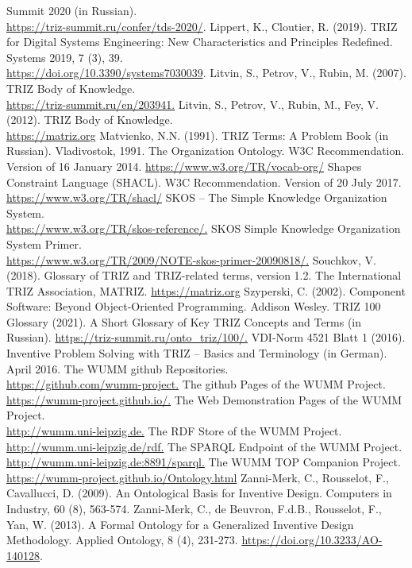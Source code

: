 \documentclass[12pt,a4paper]{article}
\begin{document}
\begin{thebibliography}{xxx}
  Summit 2020 (in Russian).\\ \url{https://triz-summit.ru/confer/tds-2020/}. 
 Lippert, K., Cloutier, R. (2019). TRIZ for Digital Systems
  Engineering: New Characteristics and Principles Redefined. Systems 2019,
  7 (3), 39.\\  \url{https://doi.org/10.3390/systems7030039}.
 Litvin, S., Petrov, V., Rubin, M. (2007). TRIZ Body of
  Knowledge.\\ \url{https://triz-summit.ru/en/203941.}
 Litvin, S., Petrov, V., Rubin, M., Fey, V. (2012). TRIZ Body of
  Knowledge.\\  \url{https://matriz.org}
 Matvienko, N.N. (1991). TRIZ Terms: A Problem Book (in Russian).
  Vladivostok, 1991.
 The Organization Ontology. W3C Recommendation. Version of 16
  January 2014.  \url{https://www.w3.org/TR/vocab-org/}
 Shapes Constraint Language (SHACL). W3C Recommendation. Version
  of 20 July 2017. \url{https://www.w3.org/TR/shacl/}
 SKOS – The Simple Knowledge Organization System.\\
  \url{https://www.w3.org/TR/skos-reference/.}
 SKOS Simple Knowledge Organization System Primer.\\
  \url{https://www.w3.org/TR/2009/NOTE-skos-primer-20090818/.}
 Souchkov, V. (2018). Glossary of TRIZ and TRIZ-related terms,
  version 1.2. The International TRIZ Association, MATRIZ.
  \url{https://matriz.org}
 Szyperski, C. (2002). Component Software: Beyond Object-Oriented
  Programming. Addison Wesley.
 TRIZ 100 Glossary (2021). A Short Glossary of Key TRIZ Concepts
  and Terms (in Russian).  \url{https://triz-summit.ru/onto_triz/100/.}
 VDI-Norm 4521 Blatt 1 (2016). Inventive Problem Solving with TRIZ
  – Basics and Terminology (in German). April 2016.
 The WUMM github Repositories.\\
  \url{https://github.com/wumm-project.}
 The github Pages of the WUMM Project.\\
  \url{https://wumm-project.github.io/.}
 The Web Demonstration Pages of the WUMM Project.\\
  \url{http://wumm.uni-leipzig.de.}
 The RDF Store of the WUMM Project.\\
  \url{http://wumm.uni-leipzig.de/rdf.}
 The SPARQL Endpoint of the WUMM Project.\\
  \url{http://wumm.uni-leipzig.de:8891/sparql.}
 The WUMM TOP Companion Project.\\
  \url{https://wumm-project.github.io/Ontology.html}
 Zanni-Merk, C., Rousselot, F., Cavallucci, D. (2009). An
  Ontological Basis for Inventive Design. Computers in Industry, 60 (8),
  563-574.
 Zanni-Merk, C., de Beuvron, F.d.B., Rousselot, F., Yan, W.
  (2013).  A Formal Ontology for a Generalized Inventive Design Methodology.
  Applied Ontology, 8 (4), 231-273.  \url{https://doi.org/10.3233/AO-140128}.
\end{thebibliography}

\end{document}
